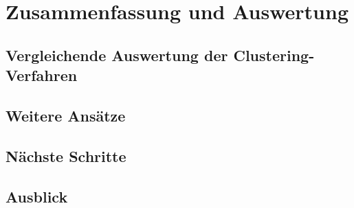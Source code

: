 \chapter{Zusammenfassung und Auswertung}

\section{Vergleichende Auswertung der Clustering-Verfahren}

\section{Weitere Ansätze}



\section{Nächste Schritte}

\section{Ausblick}
